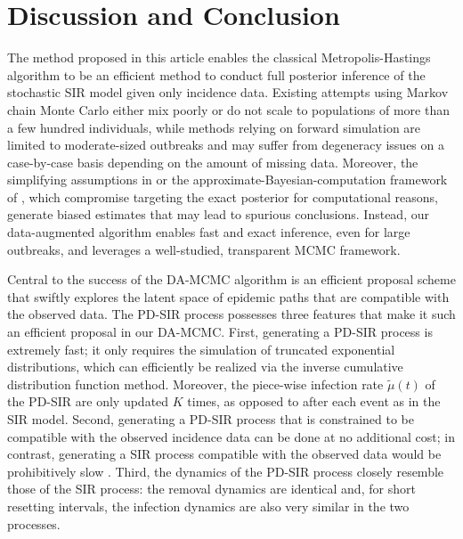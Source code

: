 \documentclass[11pt]{article}
\begin{document}
	\section{Discussion and Conclusion}
	\label{sec:dis}
	The method proposed in this article enables the classical Metropolis-Hastings algorithm to be an efficient method to conduct full posterior inference of the stochastic SIR model given only incidence data. Existing attempts using Markov chain Monte Carlo either mix poorly or do not scale to populations of more than a few hundred individuals, while methods relying on forward simulation are limited to moderate-sized outbreaks and may suffer from degeneracy issues on a case-by-case basis depending on the amount of missing data. 	Moreover, the simplifying assumptions in \cite{Fintzi.2020} or the approximate-Bayesian-computation framework of \cite{McKinley.2018}, which compromise targeting the exact posterior for computational reasons, generate biased estimates that may lead to spurious conclusions. Instead, our data-augmented algorithm enables fast and exact inference, even for large outbreaks, and leverages a well-studied, transparent MCMC framework. %
	
	Central to the success of the DA-MCMC algorithm is an efficient proposal scheme that swiftly explores the latent space of epidemic paths that are compatible with the observed data. The PD-SIR process possesses three features that make it such an efficient proposal in our DA-MCMC. First, generating a PD-SIR process is extremely fast; it only requires the simulation of truncated exponential distributions, which can efficiently be realized via the inverse cumulative distribution function method. Moreover, the piece-wise infection rate $\tilde{\mu}(t)$ of the PD-SIR are only updated $K$ times, as opposed to after each event as in the SIR model. Second, generating a PD-SIR process that is constrained to be compatible with the observed incidence data can be done at no additional cost; in contrast, generating a SIR process compatible with the observed data would be prohibitively slow \cite{Hobolth.2009}. Third, the dynamics of the PD-SIR process closely resemble those of the SIR process: the removal dynamics are identical and, for short resetting intervals, the infection dynamics are also very similar in the two processes.
	
\end{document}
